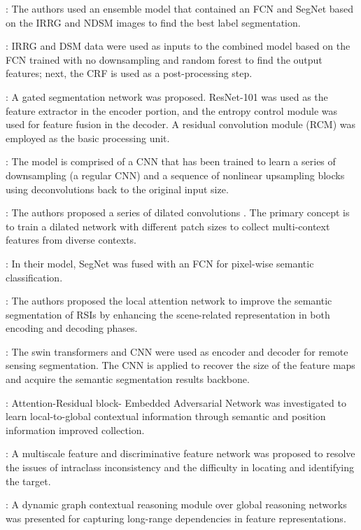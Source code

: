 \documentclass[journal]{IEEEtran}
\begin{document}
 \cite{MARMANIS2018158}: The authors used an ensemble model that contained an FCN and SegNet based on the IRRG and NDSM images to find the best label segmentation.

 \cite{7301381}: IRRG and DSM data were used as inputs to the combined model based on the FCN trained with no downsampling and random forest to find the output features; next, the CRF is used as a post-processing step.

 \cite{https://doi.org/10.48550/arxiv.1606.02585}: A gated segmentation network was proposed. ResNet{-}101 was used as the feature extractor in the encoder portion, and the entropy control module was used for feature fusion in the decoder. A residual convolution module (RCM) was employed as the basic processing unit.

 \cite{rs9050446}: The model is comprised of a CNN that has been trained to learn a series of downsampling (a regular CNN) and a sequence of nonlinear upsampling blocks using deconvolutions back to the original input size.

 \cite{7725499}: The authors proposed a series of dilated convolutions \cite{8727958}. The primary concept is to train a dilated network with different patch sizes to collect multi-context features from diverse contexts.

 \cite{10.1007/978-3-642-75988-8_28}: In their model, SegNet was fused with an FCN for pixel-wise semantic classification.

 \cite{9102424}: The authors proposed the local attention network to improve the semantic segmentation of RSIs by enhancing the scene-related representation in both encoding and decoding phases.

 \cite{9686732}: The swin transformers and CNN were used as encoder and decoder for remote sensing segmentation. The CNN is applied to recover the size of the feature maps and acquire the semantic segmentation results backbone.

 \cite{doi:10.1080/2150704X.2021.1910362}: Attention-Residual block- Embedded Adversarial Network was investigated to learn local-to-global contextual information through semantic and position information improved collection.

 \cite{doi:10.1080/01431161.2021.2018147}: A multiscale feature and discriminative feature network was proposed to resolve the issues of intraclass inconsistency and the difficulty in locating and identifying the target.

 \cite{9690154}: A dynamic graph contextual reasoning module over global reasoning networks was presented for capturing long-range dependencies in feature representations.
\end{document}
